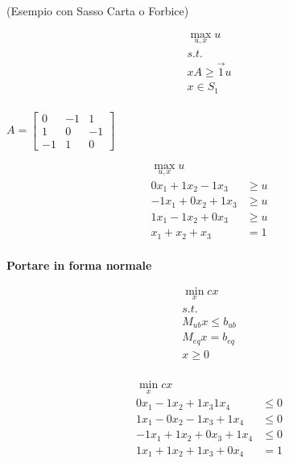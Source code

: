 \begin{esempio}(Esempio con Sasso Carta o Forbice)
\end{esempio}

\begin{equation}
    \begin{aligned}
        \max_{u,x} u \\
        s.t.         \\
        xA \geq \vec{1}u \\
        x \in S_1\\
    \end{aligned}
\end{equation}

\begin{center}
    
    $A = \begin{bmatrix}
        0 & -1 & 1 \\
        1 & 0  & -1 \\
        -1 & 1 & 0
    \end{bmatrix}
    $
\end{center}

\begin{equation}
    \begin{aligned}
        \max_{u,x} u \\
        0x_1 + 1x_2 - 1x_3 & \geq u \\
        -1x_1 + 0x_2 + 1x_3 & \geq u \\
        1x_1 - 1x_2 + 0x_3 & \geq u \\
        x_1 + x_2 + x_3 & = 1 \\
    \end{aligned}
\end{equation}

\textbf{Portare in forma normale}

\begin{equation}
    \begin{aligned}
        \min_{x} cx \\
        s.t.     \\
        M_{ub} x \leq b_{ub} \\
        M_{eq} x = b_{eq} \\
        x \geq 0 \\
    \end{aligned}
\end{equation}

\begin{equation}
    \begin{aligned}
        \min_{x} cx \\
        0x_1 - 1x_2 + 1x_3 1x_4 & \leq 0 \\
        1x_1 - 0x_2 - 1x_3 + 1x_4 & \leq 0 \\
        -1x_1 + 1x_2 + 0x_3 + 1x_4 & \leq 0 \\
        1x_1 + 1x_2 + 1x_3 + 0x_4 & = 1 \\
    \end{aligned}
\end{equation}

